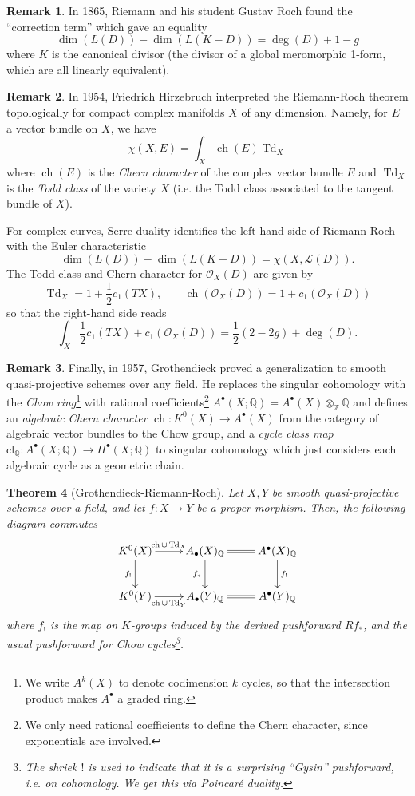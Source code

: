 \documentclass[10pt]{article}
\newtheorem{thm}{Theorem}[section]
\theoremstyle{definition}
\newtheorem{rmk}[thm]{Remark}
\DeclareMathOperator{\ch}{ch}
\DeclareMathOperator{\Td}{Td}
\newcommand{\Z}{\mathbb{Z}}
\newcommand{\Q}{\mathbb{Q}}
\newcommand{\OO}{\mathcal{O}}
\begin{document}
\begin{rmk}
In 1865, Riemann and his student Gustav Roch found the ``correction term'' which gave an equality
$$\dim(L(D)) - \dim(L(K - D)) = \deg(D) + 1 - g$$
where $K$ is the canonical divisor (the divisor of a global meromorphic 1-form, which are all linearly equivalent).
\end{rmk}

\begin{rmk}
In 1954, Friedrich Hirzebruch interpreted the Riemann-Roch theorem topologically for compact complex manifolds $X$ of any dimension.  Namely, for $E$ a vector bundle on $X$, we have
$$\chi(X, E) = \int_X \ch(E) \Td_X$$
where $\ch(E)$ is the \emph{Chern character} of the complex vector bundle $E$ and $\Td_X$ is the \emph{Todd class} of the variety $X$ (i.e. the Todd class associated to the tangent bundle of $X$).

For complex curves, Serre duality identifies the left-hand side of Riemann-Roch with the Euler characteristic
$$\dim(L(D)) - \dim(L(K-D)) = \chi(X, \mathcal{L}(D)).$$
The Todd class and Chern character for $\OO_X(D)$ are given by
$$\Td_X = 1 + \frac 1 2 c_1(TX), \;\;\;\;\;\;\; \ch(\OO_X(D)) = 1 + c_1(\OO_X(D))$$
so that the right-hand side reads
$$\int_X \frac 1 2 c_1(TX) + c_1(\OO_X(D)) = \frac 1 2 (2 - 2g) + \deg(D).$$
\end{rmk}

\begin{rmk}
Finally, in 1957, Grothendieck proved a generalization to smooth quasi-projective schemes over any field.  He replaces the singular cohomology with the \emph{Chow ring}\footnote{We write $A^k(X)$ to denote codimension $k$ cycles, so that the intersection product makes $A^\bullet$ a graded ring.} with rational coefficients\footnote{We only need rational coefficients to define the Chern character, since exponentials are involved.} $A^\bullet(X; \Q) = A^\bullet(X) \otimes_{\Z} \Q$ and defines an \emph{algebraic Chern character} $\ch: K^0(X) \rightarrow A^\bullet(X)$ from the category of algebraic vector bundles to the Chow group, and a \emph{cycle class map} $\mathrm{cl}_{\Q}: A^\bullet(X; \Q) \rightarrow H^\bullet(X; \mathbb{Q})$ to singular cohomology which just considers each algebraic cycle as a geometric chain.
\end{rmk}

\begin{thm}[Grothendieck-Riemann-Roch]
Let $X, Y$ be smooth quasi-projective schemes over a field, and let $f: X \rightarrow Y$ be a proper morphism.  Then, the following diagram commutes
$$\xymatrix{
K^0(X) \ar[r]^-{\ch  \cup \Td_X} \ar[d]_{f_!}  & A_\bullet(X)_\Q \ar@{=}[r] \ar[d]_{f_*} & A^\bullet(X)_\Q \ar[d]^{f_!}  \\
K^0(Y) \ar[r]_-{\ch \cup \Td_Y} & A_\bullet(Y)_\Q \ar@{=}[r] & A^\bullet(Y)_\Q
}$$
where $f_!$ is the map on $K$-groups induced by the derived pushforward $Rf_*$, and the usual pushforward for Chow cycles\footnote{The shriek $!$ is used to indicate that it is a surprising ``Gysin'' pushforward, i.e. on cohomology.  We get this via Poincar\'{e} duality.}.
\end{thm}
\end{document}
